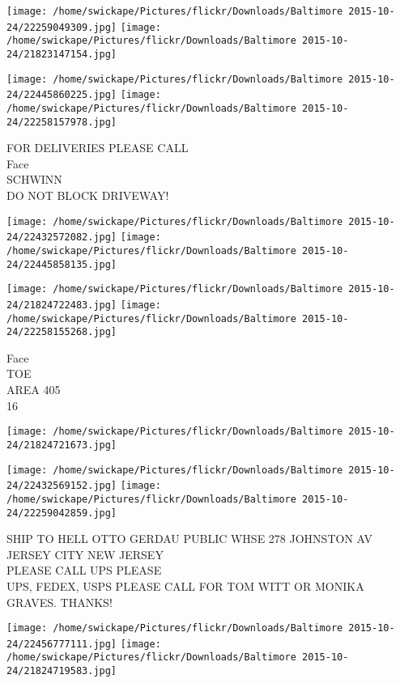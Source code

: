 \documentclass[10pt,letterpaper]{article}
\begin{document}
\texttt{[image: /home/swickape/Pictures/flickr/Downloads/Baltimore 2015-10-24/22259049309.jpg]}
\texttt{[image: /home/swickape/Pictures/flickr/Downloads/Baltimore 2015-10-24/21823147154.jpg]}

\texttt{[image: /home/swickape/Pictures/flickr/Downloads/Baltimore 2015-10-24/22445860225.jpg]}
\texttt{[image: /home/swickape/Pictures/flickr/Downloads/Baltimore 2015-10-24/22258157978.jpg]}

FOR DELIVERIES PLEASE CALL\\
Face\\
SCHWINN\\
DO NOT BLOCK DRIVEWAY!\\
\pagebreak

\texttt{[image: /home/swickape/Pictures/flickr/Downloads/Baltimore 2015-10-24/22432572082.jpg]}
\texttt{[image: /home/swickape/Pictures/flickr/Downloads/Baltimore 2015-10-24/22445858135.jpg]}

\texttt{[image: /home/swickape/Pictures/flickr/Downloads/Baltimore 2015-10-24/21824722483.jpg]}
\texttt{[image: /home/swickape/Pictures/flickr/Downloads/Baltimore 2015-10-24/22258155268.jpg]}

Face\\
TOE\\
AREA 405\\
16\\
\pagebreak

\texttt{[image: /home/swickape/Pictures/flickr/Downloads/Baltimore 2015-10-24/21824721673.jpg]}

\vspace{0.25in}
\texttt{[image: /home/swickape/Pictures/flickr/Downloads/Baltimore 2015-10-24/22432569152.jpg]}
\texttt{[image: /home/swickape/Pictures/flickr/Downloads/Baltimore 2015-10-24/22259042859.jpg]}

SHIP TO HELL OTTO GERDAU PUBLIC WHSE 278 JOHNSTON AV JERSEY CITY NEW JERSEY\\
PLEASE CALL UPS PLEASE\\
UPS, FEDEX, USPS PLEASE CALL FOR TOM WITT OR MONIKA GRAVES.  THANKS!\\
\pagebreak

\texttt{[image: /home/swickape/Pictures/flickr/Downloads/Baltimore 2015-10-24/22456777111.jpg]}
\texttt{[image: /home/swickape/Pictures/flickr/Downloads/Baltimore 2015-10-24/21824719583.jpg]}
\end{document}
